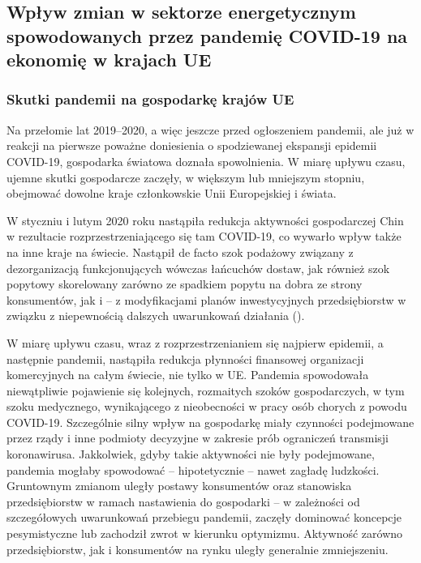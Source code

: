 \documentclass[polish, twoside, 12pt, a4paper]{article}
\theoremstyle{definition}
\theoremstyle{plain}
\theoremstyle{remark}
\begin{document}
\subsection{Wpływ zmian w sektorze energetycznym spowodowanych przez pandemię COVID-19 na ekonomię w krajach UE}

\subsubsection{Skutki pandemii na gospodarkę krajów UE}

Na przełomie lat 2019–2020, a więc jeszcze przed ogłoszeniem pandemii, ale już w reakcji na pierwsze poważne doniesienia o spodziewanej ekspansji epidemii COVID-19, gospodarka światowa doznała spowolnienia. W miarę upływu czasu, ujemne skutki gospodarcze zaczęły, w większym lub mniejszym stopniu, obejmować dowolne kraje członkowskie Unii Europejskiej i świata.  

W styczniu i lutym 2020 roku nastąpiła redukcja aktywności gospodarczej Chin w rezultacie rozprzestrzeniającego się tam COVID-19, co wywarło wpływ także na inne kraje na świecie. Nastąpił de facto szok podażowy związany z dezorganizacją funkcjonujących wówczas łańcuchów dostaw, jak również szok popytowy skorelowany zarówno ze spadkiem popytu na dobra ze strony konsumentów, jak i – z modyfikacjami planów inwestycyjnych przedsiębiorstw w związku z niepewnością dalszych uwarunkowań działania (\cite{dziembala2021}). 

W miarę upływu czasu, wraz z rozprzestrzenianiem się najpierw epidemii, a następnie pandemii, nastąpiła redukcja płynności finansowej organizacji komercyjnych na całym świecie, nie tylko w UE. Pandemia spowodowała niewątpliwie pojawienie się kolejnych, rozmaitych szoków gospodarczych, w tym szoku medycznego, wynikającego z nieobecności w pracy osób chorych z powodu COVID-19. Szczególnie silny wpływ na gospodarkę miały czynności podejmowane przez rządy i inne podmioty decyzyjne w zakresie prób ograniczeń transmisji koronawirusa. Jakkolwiek, gdyby takie aktywności nie były podejmowane, pandemia mogłaby spowodować – hipotetycznie – nawet zagładę ludzkości. Gruntownym zmianom uległy postawy konsumentów oraz stanowiska przedsiębiorstw w ramach nastawienia do gospodarki – w zależności od szczegółowych uwarunkowań przebiegu pandemii, zaczęły dominować koncepcje pesymistyczne lub zachodził zwrot w kierunku optymizmu. Aktywność zarówno przedsiębiorstw, jak i konsumentów na rynku uległy generalnie zmniejszeniu. 
\end{document}
